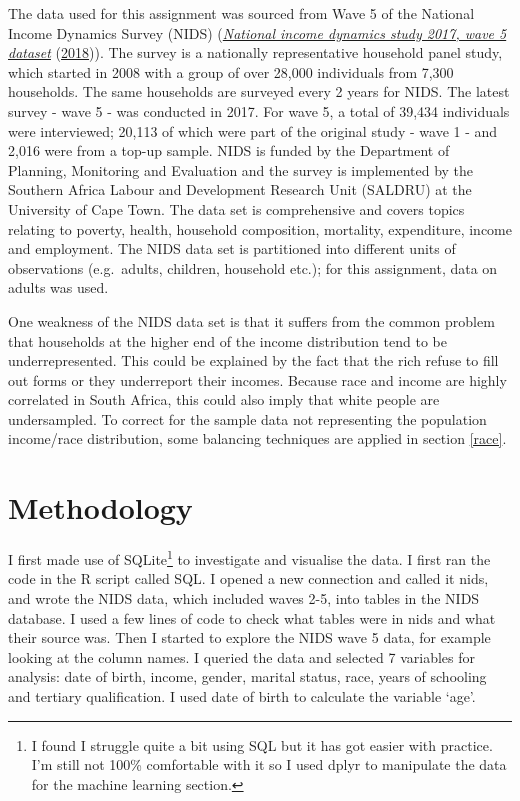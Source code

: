 \documentclass[11pt,preprint, authoryear]{elsarticle}
\numberwithin{equation}{section}
\numberwithin{figure}{section}
\numberwithin{table}{section}
\let\rmarkdownfootnote\footnote%
\def\footnote{\protect\rmarkdownfootnote}
\begin{document}
The data used for this assignment was sourced from Wave 5 of the
National Income Dynamics Survey (NIDS)
(\protect\hyperlink{ref-nids}{\emph{National income dynamics study 2017,
wave 5 dataset}} (\protect\hyperlink{ref-nids}{2018})). The survey is a
nationally representative household panel study, which started in 2008
with a group of over 28,000 individuals from 7,300 households. The same
households are surveyed every 2 years for NIDS. The latest survey - wave
5 - was conducted in 2017. For wave 5, a total of 39,434 individuals
were interviewed; 20,113 of which were part of the original study - wave
1 - and 2,016 were from a top-up sample. NIDS is funded by the
Department of Planning, Monitoring and Evaluation and the survey is
implemented by the Southern Africa Labour and Development Research Unit
(SALDRU) at the University of Cape Town. The data set is comprehensive
and covers topics relating to poverty, health, household composition,
mortality, expenditure, income and employment. The NIDS data set is
partitioned into different units of observations (e.g.~adults, children,
household etc.); for this assignment, data on adults was used.

One weakness of the NIDS data set is that it suffers from the common
problem that households at the higher end of the income distribution
tend to be underrepresented. This could be explained by the fact that
the rich refuse to fill out forms or they underreport their incomes.
Because race and income are highly correlated in South Africa, this
could also imply that white people are undersampled. To correct for the
sample data not representing the population income/race distribution,
some balancing techniques are applied in section \ref{race}.

\hypertarget{methodology}{%
\section{\texorpdfstring{Methodology
\label{Meth}}{Methodology }}\label{methodology}}

I first made use of SQLite\footnote{I found I struggle quite a bit using
  SQL but it has got easier with practice. I'm still not 100\%
  comfortable with it so I used dplyr to manipulate the data for the
  machine learning section.} to investigate and visualise the data. I
first ran the code in the R script called SQL. I opened a new connection
and called it nids, and wrote the NIDS data, which included waves 2-5,
into tables in the NIDS database. I used a few lines of code to check
what tables were in nids and what their source was. Then I started to
explore the NIDS wave 5 data, for example looking at the column names. I
queried the data and selected 7 variables for analysis: date of birth,
income, gender, marital status, race, years of schooling and tertiary
qualification. I used date of birth to calculate the variable `age'.
\end{document}
